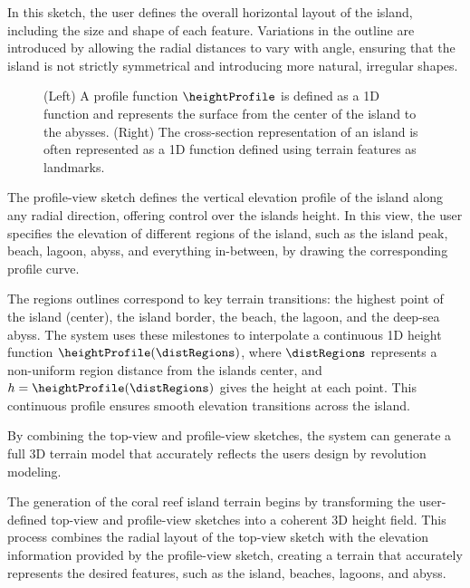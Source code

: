 In this sketch, the user defines the overall horizontal layout of the island, including the size and shape of each feature. Variations in the outline are introduced by allowing the radial distances to vary with angle, ensuring that the island is not strictly symmetrical and introducing more natural, irregular shapes.


\begin{figure}[H]
	\centering
    \caption{(Left) A profile function $\heightProfile$ is defined as a 1D function and represents the surface from the center of the island to the abysses. (Right) The cross-section representation of an island is often represented as a 1D function defined using terrain features as landmarks. }
    \label{fig:coral-island_profile-function}
\end{figure}

The profile-view sketch defines the vertical elevation profile of the island along any radial direction, offering control over the islands height. In this view, the user specifies the elevation of different regions of the island, such as the island peak, beach, lagoon, abyss, and everything in-between, by drawing the corresponding profile curve.

The regions outlines correspond to key terrain transitions: the highest point of the island (center), the island border, the beach, the lagoon, and the deep-sea abyss. The system uses these milestones to interpolate a continuous 1D height function $\heightProfile(\distRegions)$, where $\distRegions$ represents a non-uniform region distance from the islands center, and $h = \heightProfile(\distRegions)$ gives the height at each point. This continuous profile ensures smooth elevation transitions across the island.

By combining the top-view and profile-view sketches, the system can generate a full 3D terrain model that accurately reflects the users design by revolution modeling.

The generation of the coral reef island terrain begins by transforming the user-defined top-view and profile-view sketches into a coherent 3D height field. This process combines the radial layout of the top-view sketch with the elevation information provided by the profile-view sketch, creating a terrain that accurately represents the desired features, such as the island, beaches, lagoons, and abyss.

